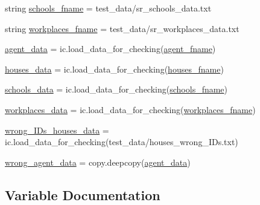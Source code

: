 \begin{DoxyCompactItemize}
\item 
string \hyperlink{namespacesimply__random__test_ac6f2019b7569e75e60375be8b4799019}{schools\+\_\+fname} = \textquotesingle{}test\+\_\+data/sr\+\_\+schools\+\_\+data.\+txt\textquotesingle{}
\item 
string \hyperlink{namespacesimply__random__test_ad486aeb4c1fc35a1a16d91fd7593e9e2}{workplaces\+\_\+fname} = \textquotesingle{}test\+\_\+data/sr\+\_\+workplaces\+\_\+data.\+txt\textquotesingle{}
\item 
\hyperlink{namespacesimply__random__test_a5cd8a604cc785042928b0001b50a8205}{agent\+\_\+data} = ic.\+load\+\_\+data\+\_\+for\+\_\+checking(\hyperlink{namespacesimply__random__test_a322bcb2eda616d1b52d78238a800f4e4}{agent\+\_\+fname})
\item 
\hyperlink{namespacesimply__random__test_ae0dc4317b293ebf9367c01cbbc643b87}{houses\+\_\+data} = ic.\+load\+\_\+data\+\_\+for\+\_\+checking(\hyperlink{namespacesimply__random__test_a62cb7d819c0715e47baacb1bbf5cad3a}{houses\+\_\+fname})
\item 
\hyperlink{namespacesimply__random__test_a826a71d3a69b10ee556f90eb36f2bdfb}{schools\+\_\+data} = ic.\+load\+\_\+data\+\_\+for\+\_\+checking(\hyperlink{namespacesimply__random__test_ac6f2019b7569e75e60375be8b4799019}{schools\+\_\+fname})
\item 
\hyperlink{namespacesimply__random__test_af55c16643160d69369f3ad7b56fdc790}{workplaces\+\_\+data} = ic.\+load\+\_\+data\+\_\+for\+\_\+checking(\hyperlink{namespacesimply__random__test_ad486aeb4c1fc35a1a16d91fd7593e9e2}{workplaces\+\_\+fname})
\item 
\hyperlink{namespacesimply__random__test_ae4944cdef7d0435d7ccc0fa9110e1581}{wrong\+\_\+\+I\+Ds\+\_\+houses\+\_\+data} = ic.\+load\+\_\+data\+\_\+for\+\_\+checking(\textquotesingle{}test\+\_\+data/houses\+\_\+wrong\+\_\+\+I\+Ds.\+txt\textquotesingle{})
\item 
\hyperlink{namespacesimply__random__test_a15e2c91759b37a32eb69cdf1a6ae9f88}{wrong\+\_\+agent\+\_\+data} = copy.\+deepcopy(\hyperlink{namespacesimply__random__test_a5cd8a604cc785042928b0001b50a8205}{agent\+\_\+data})
\end{DoxyCompactItemize}


\subsection{Variable Documentation}
\mbox{\label{namespacesimply__random__test_a5cd8a604cc785042928b0001b50a8205}} 
